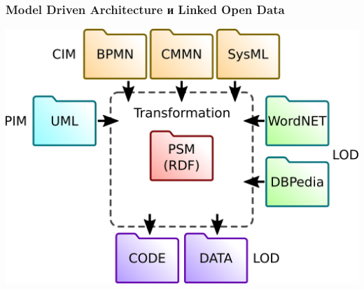 \documentclass[10pt]{beamer}
\begin{document}
\begin{frame} \frametitle{Model Driven Architecture и Linked Open Data} \begin{center} \includegraphics[width=0.9\linewidth]{mda-overview.pdf} \end{center}
\end{frame}
\end{document}

